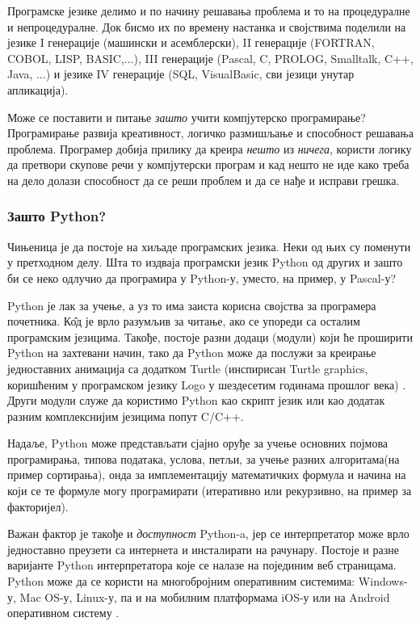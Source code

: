 Програмске језике делимо и по начину решавања проблема и то на процедуралне и непроцедуралне. Док бисмо их по времену настанка и својствима поделили на језике I генерације (машински и асемблерски), II генерације (FORTRAN, COBOL, LISP, BASIC,...), III генерације (Pascal, C, PROLOG, Smalltalk, C++, Java, ...) и језике IV генерације (SQL, VisualBasic, сви језици унутар апликација). \cite{tosic}

Може се поставити и питање \emph{зашто} учити компјутерско програмирање? Програмирање развија креативност, логичко размишљање и способност решавања проблема. Програмер добија прилику да креира \emph{нешто} из \emph{ничега}, користи логику да претвори скупове речи у компјутерски програм и кад нешто не иде како треба на дело долази способност да се реши проблем и да се нађе и исправи грешка.

\subsubsection{Зашто Python?}
Чињеница је да постоје на хиљаде програмских језика. Неки од њих су поменути у претходном делу. Шта то издваја програмски језик Python од других и зашто би се неко одлучио да програмира у Python-у, уместо, на пример, у Pascal-у?

Python је лак за учење, а уз то има заиста корисна својства за програмера почетника. К\^{о}д је врло разумљив за читање, ако се упореди са осталим програмским језицима. Такође, постоје разни додаци (модули) који ће проширити Python на захтевани начин, тако да Python може да послужи за креирање једноставних анимација са додатком Turtle (инспирисан Turtle graphics, коришћеним у програмском језику Logo у шездесетим годинама прошлог века) \cite{briggs2012python}. Други модули служе да користимо Python као скрипт језик или као додатак разним комплекснијим језицима попут  C/C++.

Надаље, Python може представљати сјајно оруђе за учење основних појмова програмирања, типова података, услова, петљи, за учење разних алгоритама(на пример сортирања), онда за имплементацију математичких формула и начина на који се те формуле могу програмирати (итеративно или рекурзивно, на пример за факторијел).

Важан фактор је такође и \emph{доступност} Python-a, јер се интерпретатор може врло једноставно преузети са интернета и инсталирати на рачунару. Постоје и разне варијанте Python интерпретатора које се налазе на појединим веб страницама. Python може да се користи на многобројним оперативним системима: Windows-у, Mac OS-у, Linux-у, па и на мобилним платформама iOS-у или на Android оперативном систему \cite{pythonsite} .

